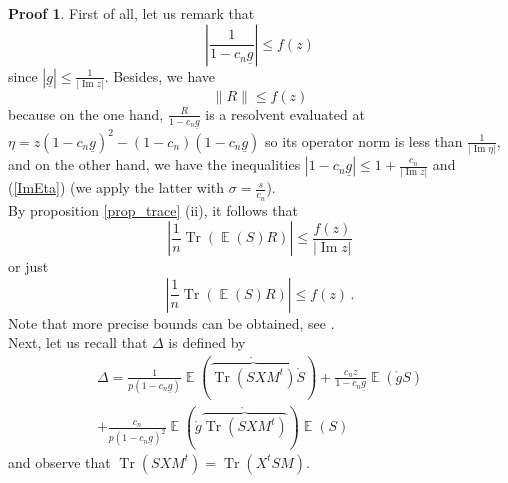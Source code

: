 \documentclass[11pt,a4paper]{article}
\DeclareMathOperator{\E}{\mathbb{E}}
\DeclareMathOperator{\1}{\mathbf{1}}
\DeclareMathOperator{\Imag}{\mathrm{Im}}
\DeclareMathOperator{\Tr}{\mathrm{Tr}}
\newcommand{\gbar}{\underline{g}}
\theoremstyle{definition}
\newtheorem*{Proof}{Proof}
\begin{document}
\begin{Proof}
First of all, let us remark that
\begin{displaymath}
\left| \frac{1}{1-c_n\gbar} \right| \le f(z)
\end{displaymath}
since $|\gbar| \le \frac{1}{|\Imag z|}$. Besides, we have
\begin{equation} \label{freeness_Gaussian_eq11}
\|R\| \le f(z)
\end{equation}
because on the one hand, $\frac{R}{1-c_n\gbar}$ is a resolvent evaluated at $\eta = z(1-c_n\gbar)^2 - (1-c_n)(1-c_n\gbar)$ so its operator norm is less than $\frac{1}{|\Imag \eta|}$, and on the other hand, we have the inequalities $|1-c_n\gbar| \le 1 + \frac{c_n}{|\Imag z|}$ and (\ref{ImEta}) (we apply the latter with $\sigma = \frac{s}{c_n}$).\\
By proposition \ref{prop_trace} (ii), it follows that
\begin{displaymath}
\left| \frac1n \Tr(\E(S)R) \right| \le \frac{f(z)}{|\Imag z|}
\end{displaymath}
or just
\begin{equation} \label{freeness_Gaussian_eq12}
\left| \frac1n \Tr(\E(S)R) \right| \le f(z) \, .
\end{equation}
Note that more precise bounds can be obtained, see \cite[Appendix E]{VLM}.\\

Next, let us recall that $\Delta$ is defined by
\begin{multline*}
\Delta = \frac{1}{p(1-c_n\gbar)} \E \left( \mathring{\overbrace{\Tr(SXM^t)}} \mathring{S} \right) + \frac{c_n z}{1-c_n\gbar} \E( \mathring{g}S ) \\
+ \frac{c_n}{p(1-c_n\gbar)^2} \E \left( \mathring{g} \mathring{\overbrace{\Tr(SXM^t)}} \right) \E(S)
\end{multline*}
and observe that $\Tr(SXM^t) = \Tr(X^tSM)$.\\


\end{Proof}
\end{document}
